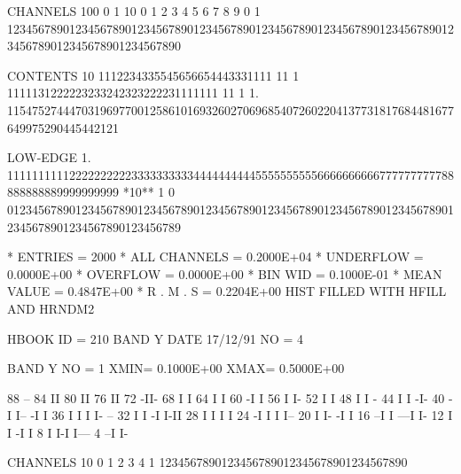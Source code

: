 \begin{Listing}
 CHANNELS 100   0                                                                                                  1   
           10   0        1         2         3         4         5         6         7         8         9         0   
            1   1234567890123456789012345678901234567890123456789012345678901234567890123456789012345678901234567890   
 
 CONTENTS  10                   1112234335545656654443331111 11 1   1111131222223233242323222231111111 11 1         
            1.            115475274447031969770012586101693260270696854072602204137731817684481677649975290445442121
 
 LOW-EDGE   1.            111111111122222222223333333333444444444455555555556666666666777777777788888888889999999999
 *10**  1   0   0123456789012345678901234567890123456789012345678901234567890123456789012345678901234567890123456789
 
 * ENTRIES =       2000      * ALL CHANNELS = 0.2000E+04      * UNDERFLOW = 0.0000E+00      * OVERFLOW = 0.0000E+00
 * BIN WID = 0.1000E-01      * MEAN VALUE   = 0.4847E+00      * R . M . S = 0.2204E+00
\finalnewpage
 HIST FILLED WITH HFILL AND HRNDM2                                               
 
 HBOOK     ID =       210             BAND Y                     DATE  17/12/91              NO =   4
 
 BAND Y      NO =   1     XMIN=  0.1000E+00  XMAX=  0.5000E+00
 
       88                  --
       84                  II
       80                  II
       76                  II
       72                 -II-
       68                 I  I
       64                 I  I
       60                -I  I
       56                I   I-
       52                I    I
       48                I    I            -
       44                I    I           -I-
       40               -I    I--        -I I
       36               I       I        I  I- --
       32               I       I       -I   I-II
       28               I       I       I       I
       24              -I       I       I       I--
       20              I        I-     -I         I
       16            --I         I  ---I          I-
       12            I           I -I              I
        8            I           I-I               I---
        4          --I                                I-
 
 CHANNELS  10   0        1         2         3         4   
            1   1234567890123456789012345678901234567890   
 

\end{Listing}
